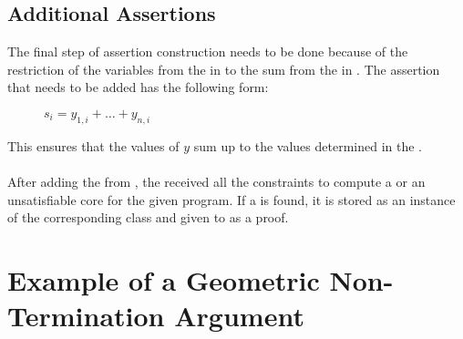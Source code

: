 \subsection{Additional Assertions}
\label{sec:additional-assertion}
The final step of assertion construction needs to be done because of the restriction of the variables from the \rayc in  to the sum from the \pointc in .\newline
The assertion that needs to be added has the following form:
\begin{figure}[H]
	\centering
	$s_i = y_{1,i}+ \dots + y_{n,i}$
\end{figure}
This ensures that the values of $y$ sum up to the values determined in the \pointc.
\\
\\
After adding the \addasss from , the \solver received all the constraints to compute a \gna or an unsatisfiable core for the given program.\newline
If a \gna is found, it is stored as an instance of the corresponding class and given to \aprove as a proof.

\section{Example of a Geometric Non-Termination Argument}
\label{sec:verification-of-gna}

